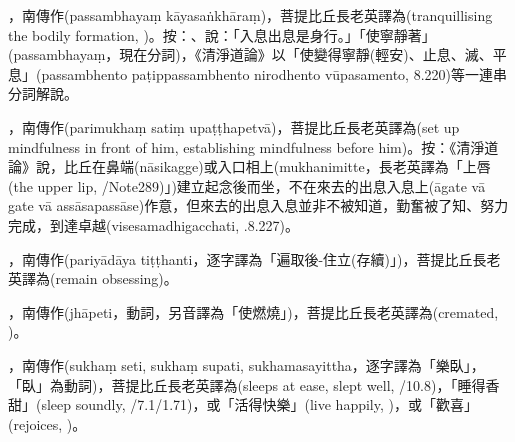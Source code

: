 \startitemgroup[noteitems]
\item{}，南傳作(passambhayaṃ kāyasaṅkhāraṃ)，菩提比丘長老英譯為(tranquillising the bodily formation, )。按：、說：「入息出息是身行。」「使寧靜著」(passambhayaṃ，現在分詞)，《清淨道論》以「使變得寧靜(輕安)、止息、滅、平息」(passambhento paṭippassambhento nirodhento vūpasamento, 8.220)等一連串分詞解說。
\stopitemgroup

\startitemgroup[noteitems]
\item{}，南傳作(parimukhaṃ satiṃ upaṭṭhapetvā)，菩提比丘長老英譯為(set up mindfulness in front of him, establishing mindfulness before him)。按：《清淨道論》說，比丘在鼻端(nāsikagge)或入口相上(mukhanimitte，長老英譯為「上唇(the upper lip, /Note289)」)建立起念後而坐，不在來去的出息入息上(āgate vā gate vā assāsapassāse)作意，但來去的出息入息並非不被知道，勤奮被了知、努力完成，到達卓越(visesamadhigacchati, .8.227)。
\stopitemgroup

\startitemgroup[noteitems]
\item{}，南傳作(pariyādāya tiṭṭhanti，逐字譯為「遍取後-住立(存續)」)，菩提比丘長老英譯為(remain obsessing)。
\stopitemgroup

\startitemgroup[noteitems]
\item{}，南傳作(jhāpeti，動詞，另音譯為「使燃燒」)，菩提比丘長老英譯為(cremated, )。
\stopitemgroup

\startitemgroup[noteitems]
\item{}，南傳作(sukhaṃ seti, sukhaṃ supati, sukhamasayittha，逐字譯為「樂臥」，「臥」為動詞)，菩提比丘長老英譯為(sleeps at ease, slept well, /10.8)，「睡得香甜」(sleep soundly, /7.1/1.71)，或「活得快樂」(live happily, )，或「歡喜」(rejoices, )。
\stopitemgroup

